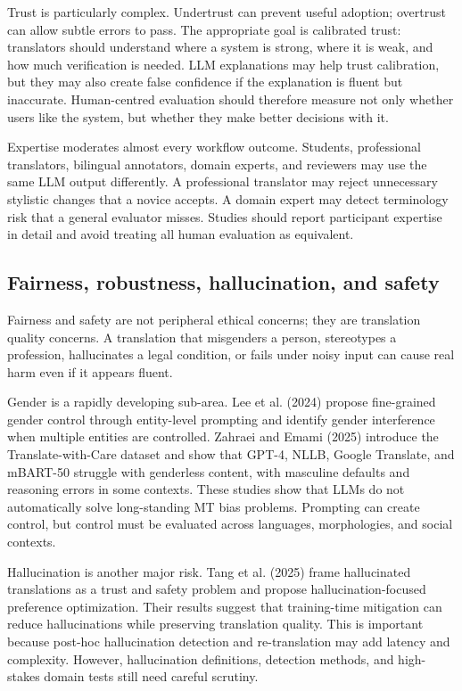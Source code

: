 \documentclass[11pt]{article}
\begin{document}
Trust is particularly complex. Undertrust can prevent useful adoption; overtrust can allow subtle errors to pass. The appropriate goal is calibrated trust: translators should understand where a system is strong, where it is weak, and how much verification is needed. LLM explanations may help trust calibration, but they may also create false confidence if the explanation is fluent but inaccurate. Human-centred evaluation should therefore measure not only whether users like the system, but whether they make better decisions with it.

Expertise moderates almost every workflow outcome. Students, professional translators, bilingual annotators, domain experts, and reviewers may use the same LLM output differently. A professional translator may reject unnecessary stylistic changes that a novice accepts. A domain expert may detect terminology risk that a general evaluator misses. Studies should report participant expertise in detail and avoid treating all human evaluation as equivalent.


\subsection{Fairness, robustness, hallucination, and safety}
Fairness and safety are not peripheral ethical concerns; they are translation quality concerns. A translation that misgenders a person, stereotypes a profession, hallucinates a legal condition, or fails under noisy input can cause real harm even if it appears fluent.

Gender is a rapidly developing sub-area. Lee et al. (2024) propose fine-grained gender control through entity-level prompting and identify gender interference when multiple entities are controlled. Zahraei and Emami (2025) introduce the Translate-with-Care dataset and show that GPT-4, NLLB, Google Translate, and mBART-50 struggle with genderless content, with masculine defaults and reasoning errors in some contexts. These studies show that LLMs do not automatically solve long-standing MT bias problems. Prompting can create control, but control must be evaluated across languages, morphologies, and social contexts.

Hallucination is another major risk. Tang et al. (2025) frame hallucinated translations as a trust and safety problem and propose hallucination-focused preference optimization. Their results suggest that training-time mitigation can reduce hallucinations while preserving translation quality. This is important because post-hoc hallucination detection and re-translation may add latency and complexity. However, hallucination definitions, detection methods, and high-stakes domain tests still need careful scrutiny.
\end{document}
